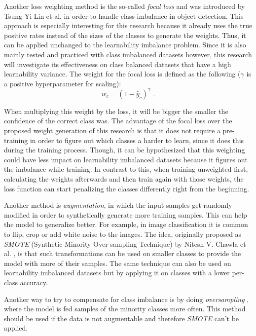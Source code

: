 \documentclass[journal]{IEEEtran}
\begin{document}
Another loss weighting method is the so-called \emph{focal loss} and was introduced by Tsung-Yi Lin et al. \cite{lin2017focal} in order to handle class imbalance in object detection.
This approach is especially interesting for this research because it already uses the true positive rates instead of the sizes of the classes to generate the weights.
Thus, it can be applied unchanged to the learnability imbalance problem.
Since it is also mainly tested and practiced with class imbalanced datasets however, this research will investigate its effectiveness on class balanced datasets that have a high learnability variance.
The weight for the focal loss is defined as the following ($\gamma$ is a positive hyperparameter for scaling):
\[ w_c = (1 - \hat{y}_c)^\gamma \text{ .} \tag{4} \]

When multiplying this weight by the loss, it will be bigger the smaller the confidence of the correct class was. 
The advantage of the focal loss over the proposed weight generation of this research is that it does not require a pre-training in order to figure out which classes a harder to learn, since it does this during the training process.
Though, it can be hypothesized that this weighting could have less impact on learnability imbalanced datasets because it figures out the imbalance while training.
In contrast to this, when training unweighted first, calculating the weights afterwards and then train again with those weights, the loss function can start penalizing the classes differently right from the beginning.

Another method is \emph{augmentation}, in which the input samples get randomly modified in order to synthetically generate more training samples.
This can help the model to generalize better. 
For example, in image classification it is common to flip, crop or add white noise to the images. 
The idea, originally proposed as \emph{SMOTE} (Synthetic Minority Over-sampling Technique) by Nitesh V. Chawla et al. \cite{chawla2002smote}, is that such transformations can be used on smaller classes to provide the model with more of their samples.
The same technique can also be used on learnability imbalanced datasets but by applying it on classes with a lower per-class accuracy.

Another way to try to compensate for class imbalance is by doing \emph{oversampling} \cite{chawla2002smote}, where the model is fed samples of the minority classes more often.
This method should be used if the data is not augmentable and therefore \emph{SMOTE} can't be applied.
\end{document}

